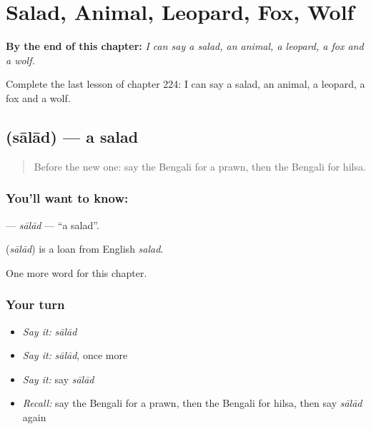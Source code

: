 
\chapter{Salad, Animal, Leopard, Fox, Wolf}
\label{ch:bn-salad-animal-leopard-fox-wolf}

\begin{chapteropening}
\textbf{By the end of this chapter:} \emph{I can say a salad, an animal, a leopard, a fox and a wolf.}

Complete the last lesson of chapter 224: I can say a salad, an animal, a leopard, a fox and a wolf.
\end{chapteropening}

\section[\texorpdfstring{\bn{সালাদ} (sālād)}{সালাদ (sālād)}]{ (sālād) — a salad}

\label{lesson:BN-C224-salad}



\begin{quote}
Before the new one: say the Bengali for a prawn, then the Bengali for hilsa.
\end{quote}

\subsection*{You'll want to know: }
\textbf{} — \emph{sālād} — \textquotedblleft{}a salad\textquotedblright{}.

\begin{cousinweb}
\textbf{} (\emph{sālād}) is a loan from English \emph{salad}.
\end{cousinweb}

\begin{grammarlens}[title={What you've built}]
One more word for this chapter.
\end{grammarlens}

\subsection*{Your turn}
\begin{itemize}
\raggedright
  \item \emph{Say it:} \emph{sālād}
  \item \emph{Say it:} \emph{sālād}, once more
  \item \emph{Say it:} say \emph{sālād}
  \item \emph{Recall:} say the Bengali for a prawn, then the Bengali for hilsa, then say \emph{sālād} again
\end{itemize}

